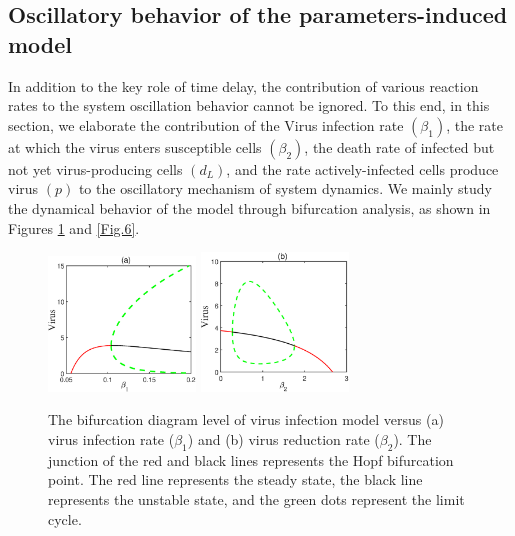 \documentclass{CMHPhD-SIVD}
\begin{document}
\subsection{Oscillatory behavior of the parameters-induced model}
In addition to the key role of time delay, the contribution of various reaction rates to the system oscillation behavior cannot be ignored. To this end,  in this section, we elaborate the contribution of the Virus infection rate $(\beta_1)$, the rate at which the virus enters susceptible cells $(\beta_2)$, the death rate of infected but not yet virus-producing cells $(d_L)$, and the rate actively-infected cells produce virus $(p)$ to the oscillatory mechanism of system dynamics. We mainly study the dynamical behavior of the model through bifurcation analysis, as shown in Figures \ref{Fig.4} and \ref{Fig.6}. 
\begin{figure}[h!]
\centering
\includegraphics[height=0.20\textheight,width=0.35\textwidth]{A1.eps}
\includegraphics[height=0.20\textheight,width=0.35\textwidth]{A2.eps}
\vspace{3mm}
\caption{The bifurcation diagram level of virus infection model versus (a) virus infection rate ($\beta_1$) and (b) virus reduction rate ($\beta_2$). The junction of the red and black lines represents the Hopf bifurcation point. The red line represents the steady state, the black line represents the unstable state, and the green dots represent the limit cycle.}
\label{Fig.4}
\end{figure}
\end{document}
